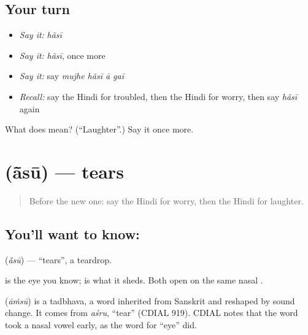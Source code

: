 \subsection*{Your turn}
\begin{itemize}
\raggedright
  \item \emph{Say it:} \emph{hãsī}
  \item \emph{Say it:} \emph{hãsī}, once more
  \item \emph{Say it:} say \emph{mujhe hãsī ā gaī}
  \item \emph{Recall:} say the Hindi for troubled, then the Hindi for worry, then say \emph{hãsī} again
\end{itemize}

\begin{tcolorbox}[breakable,colback=teal!4,colframe=teal!35!black,title={Before you move on}]
What does  mean? (\textquotedblleft{}Laughter\textquotedblright{}.) Say it once more.
\end{tcolorbox}
\section[\texorpdfstring{\hi{आँसू} (ā̃sū)}{आँसू (ā̃sū)}]{ (ā̃sū) — tears}

\label{lesson:HI-C109-ansu}



\begin{quote}
Before the new one: say the Hindi for worry, then the Hindi for laughter.
\end{quote}

\subsection*{You'll want to know: }
\textbf{} (\emph{ā̃sū}) — \textquotedblleft{}tears\textquotedblright{}, a teardrop.

\textbf{} is the eye you know; \textbf{} is what it sheds. Both open on the same nasal \textbf{}.

\begin{cousinweb}
\textbf{} (\emph{āṁsū}) is a tadbhava, a word inherited from Sanskrit and reshaped by sound change. It comes from \emph{aśru}, \textquotedblleft{}tear\textquotedblright{} (CDIAL 919). CDIAL notes that the word took a nasal vowel early, as the word for \textquotedblleft{}eye\textquotedblright{} did.
\end{cousinweb}

